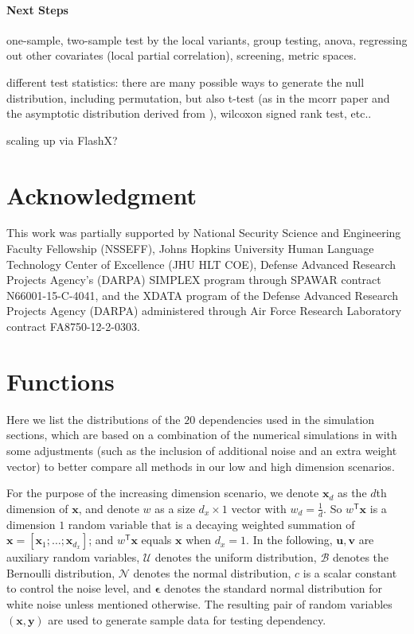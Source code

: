 \documentclass[11pt]{article}
\newcommand{\T}{^{\ensuremath{\mathsf{T}}}}           %
\providecommand{\mb}[1]{\boldsymbol{#1}}
\providecommand{\mc}[1]{\mathcal{#1}}
\begin{document}
\paragraph{Next Steps}

one-sample, two-sample test by the local variants, group testing, anova, regressing out other covariates (local partial correlation), screening, metric spaces.

different test statistics: there are many possible ways to generate the null distribution, including permutation, but also t-test (as in the mcorr paper \cite{SzekelyRizzo2013a} and the asymptotic distribution derived from \cite{GrettonEtAl2012}), wilcoxon signed rank test, etc..

scaling up via FlashX?

\section*{Acknowledgment}
This work was partially supported by 
% 
National Security Science and Engineering Faculty Fellowship (NSSEFF), 
% 
Johns Hopkins University Human Language Technology Center of Excellence (JHU HLT COE), 
% 
Defense Advanced Research Projects Agency's (DARPA) SIMPLEX program through SPAWAR contract N66001-15-C-4041, 
% 
and the XDATA program of the Defense Advanced Research Projects Agency (DARPA) administered through Air Force Research Laboratory contract FA8750-12-2-0303.



\appendix
\setcounter{figure}{0}
\renewcommand\thefigure{\arabic{figure}} 

\section{Functions}
\label{appen:function}

Here we list the distributions of the $20$ dependencies used in the simulation sections, which are based on a combination of the numerical simulations in \cite{SzekelyRizzoBakirov2007, SimonTibshirani2012, SimonTibshirani2012, GorfineHellerHeller2012} with some adjustments (such as the inclusion of additional noise and an extra weight vector) to better compare all methods in our low and high dimension scenarios.

For the purpose of the increasing dimension scenario, we denote $\mb{x}_{d}$ as the $d$th dimension of $\mb{x}$, and denote $w$ as a size $d_{x} \times 1$ vector with $w_{d}=\frac{1}{d}$. So $w\T \mb{x}$ is a dimension $1$ random variable that is a decaying weighted summation of $\mb{x}=[\mb{x}_{1};\ldots;\mb{x}_{d_{x}}]$; and $w\T \mb{x}$ equals $\mb{x}$ when $d_{x}=1$. In the following, $\mb{u}, \mb{v}$ are auxiliary random variables, $\mc{U}$ denotes the uniform distribution, $\mc{B}$ denotes the Bernoulli distribution, $\mc{N}$ denotes the normal distribution, $c$ is a scalar constant to control the noise level, and $\mb{\epsilon}$ denotes the standard normal distribution for white noise unless mentioned otherwise. The resulting pair of random variables $(\mb{x},\mb{y})$ are used to generate sample data for testing dependency.
\end{document}
